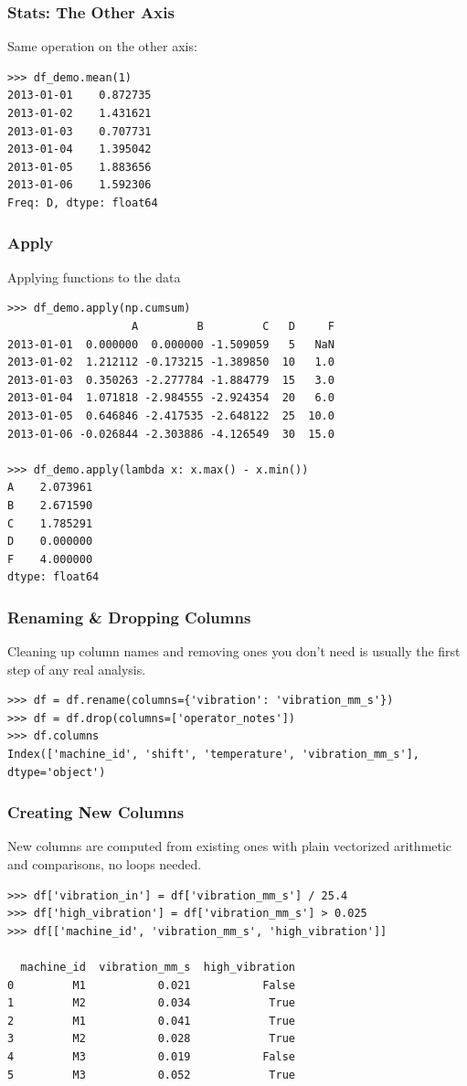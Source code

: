 \begin{frame}[fragile]\frametitle{Stats: The Other Axis}
Same operation on the other axis:
\begin{lstlisting}
>>> df_demo.mean(1)
2013-01-01    0.872735
2013-01-02    1.431621
2013-01-03    0.707731
2013-01-04    1.395042
2013-01-05    1.883656
2013-01-06    1.592306
Freq: D, dtype: float64
\end{lstlisting}
\end{frame}

\begin{frame}[fragile]\frametitle{Apply}
Applying functions to the data
\begin{lstlisting}
>>> df_demo.apply(np.cumsum)
                   A         B         C   D     F
2013-01-01  0.000000  0.000000 -1.509059   5   NaN
2013-01-02  1.212112 -0.173215 -1.389850  10   1.0
2013-01-03  0.350263 -2.277784 -1.884779  15   3.0
2013-01-04  1.071818 -2.984555 -2.924354  20   6.0
2013-01-05  0.646846 -2.417535 -2.648122  25  10.0
2013-01-06 -0.026844 -2.303886 -4.126549  30  15.0

>>> df_demo.apply(lambda x: x.max() - x.min())
A    2.073961
B    2.671590
C    1.785291
D    0.000000
F    4.000000
dtype: float64
\end{lstlisting}
\end{frame}

\begin{frame}[fragile]\frametitle{Renaming \& Dropping Columns}
Cleaning up column names and removing ones you don't need is usually the first step of any real analysis.
\begin{lstlisting}
>>> df = df.rename(columns={'vibration': 'vibration_mm_s'})
>>> df = df.drop(columns=['operator_notes'])
>>> df.columns
Index(['machine_id', 'shift', 'temperature', 'vibration_mm_s'], dtype='object')
\end{lstlisting}
\end{frame}

\begin{frame}[fragile]\frametitle{Creating New Columns}
New columns are computed from existing ones with plain vectorized arithmetic and comparisons, no loops needed.
\begin{lstlisting}
>>> df['vibration_in'] = df['vibration_mm_s'] / 25.4
>>> df['high_vibration'] = df['vibration_mm_s'] > 0.025
>>> df[['machine_id', 'vibration_mm_s', 'high_vibration']]

  machine_id  vibration_mm_s  high_vibration
0         M1           0.021           False
1         M2           0.034            True
2         M1           0.041            True
3         M2           0.028            True
4         M3           0.019           False
5         M3           0.052            True
\end{lstlisting}
\end{frame}

